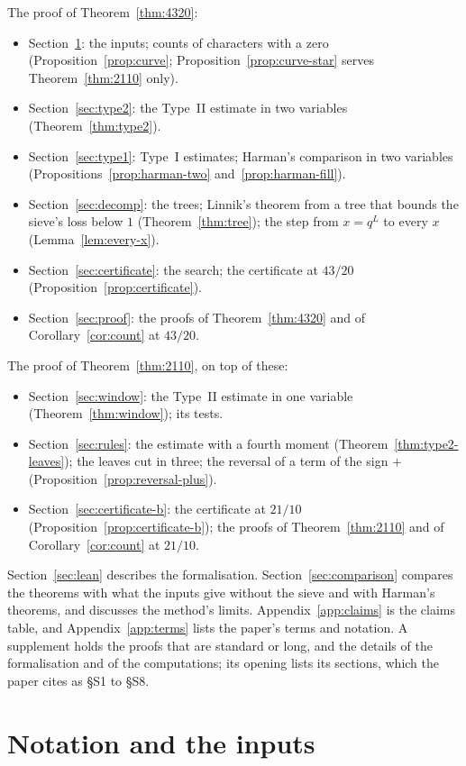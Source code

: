 \documentclass[11pt]{article}
\theoremstyle{definition}
\begin{document}
The proof of Theorem~\ref{thm:4320}:
\begin{itemize}
\item Section~\ref{sec:inputs}: the inputs; counts of characters with a zero (Proposition~\ref{prop:curve};
  Proposition~\ref{prop:curve-star} serves Theorem~\ref{thm:2110} only).
\item Section~\ref{sec:type2}: the Type~II estimate in two variables (Theorem~\ref{thm:type2}).
\item Section~\ref{sec:type1}: Type~I estimates; Harman's comparison in two variables
  (Propositions~\ref{prop:harman-two} and~\ref{prop:harman-fill}).
\item Section~\ref{sec:decomp}: the trees; Linnik's theorem from a tree that bounds the sieve's loss below $1$
  (Theorem~\ref{thm:tree}); the step from $x = q^L$ to every $x$ (Lemma~\ref{lem:every-x}).
\item Section~\ref{sec:certificate}: the search; the certificate at $43/20$ (Proposition~\ref{prop:certificate}).
\item Section~\ref{sec:proof}: the proofs of Theorem~\ref{thm:4320} and of Corollary~\ref{cor:count} at $43/20$.
\end{itemize}
The proof of Theorem~\ref{thm:2110}, on top of these:
\begin{itemize}
\item Section~\ref{sec:window}: the Type~II estimate in one variable (Theorem~\ref{thm:window}); its tests.
\item Section~\ref{sec:rules}: the estimate with a fourth moment (Theorem~\ref{thm:type2-leaves}); the leaves cut in
  three; the reversal of a term of the sign $+$ (Proposition~\ref{prop:reversal-plus}).
\item Section~\ref{sec:certificate-b}: the certificate at $21/10$ (Proposition~\ref{prop:certificate-b}); the proofs
  of Theorem~\ref{thm:2110} and of Corollary~\ref{cor:count} at $21/10$.
\end{itemize}
Section~\ref{sec:lean} describes the formalisation. Section~\ref{sec:comparison} compares the theorems with what the
inputs give without the sieve and with Harman's theorems, and discusses the method's limits. Appendix~\ref{app:claims}
is the claims table, and Appendix~\ref{app:terms} lists the paper's terms and notation. A supplement holds the proofs
that are standard or long, and the details of the formalisation and of the computations; its opening lists its
sections, which the paper cites as \S S1 to \S S8.

\section{Notation and the inputs}\label{sec:inputs}
\end{document}
